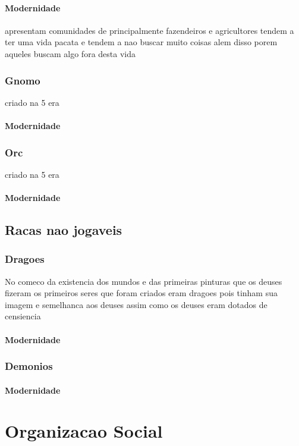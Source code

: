 \documentclass{book}
\begin{document}
\subsection{Modernidade}
apresentam comunidades de principalmente fazendeiros e agricultores tendem a ter uma vida pacata
e tendem a nao buscar muito coisas alem disso porem aqueles buscam algo fora desta vida 

\section{Gnomo}
criado na 5 era

\subsection{Modernidade}

\section{Orc}
criado na 5 era 
\subsection{Modernidade}

\chapter{Racas nao jogaveis}
\section{Dragoes}
No comeco da existencia dos mundos e das primeiras pinturas que os deuses fizeram os primeiros 
seres que foram criados eram dragoes pois tinham sua imagem e semelhanca aos deuses assim como
os deuses eram dotados de censiencia 
\subsection*{Modernidade}

\section{Demonios} 
\subsection*{Modernidade}

\part{Organizacao Social}
\end{document}
